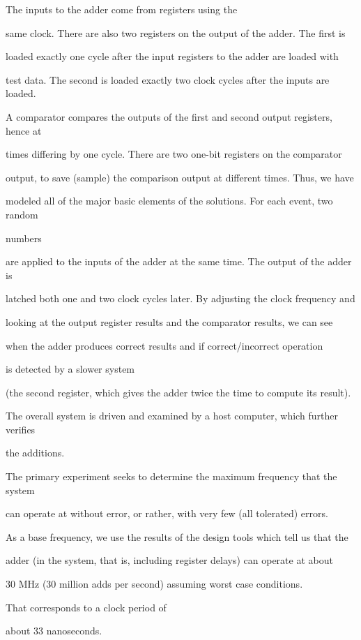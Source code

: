 \documentclass[12pt,dvips]{article}
\begin{document}
The inputs to the adder come from registers using the

same clock. There are also two registers on the output of the adder. The first is

loaded exactly one cycle after the input registers to the adder are loaded with

test data. The second is loaded exactly two clock cycles after the inputs are loaded.

A comparator compares the outputs of the first and second output registers, hence at

times differing by one cycle. There are two one-bit registers on the comparator

output, to save (sample) the comparison output at different times. Thus, we have

modeled all of the major basic elements of the solutions. For each event, two random

numbers 

are applied to the inputs of the adder at the same time. The output of the adder is

latched both one and two clock cycles later. By adjusting the clock frequency and

looking at the output register results and the comparator results, we can see

when the adder produces correct results and if correct/incorrect operation

is detected by a slower system

(the second register, which gives the adder twice the time to compute its result).

The overall system is driven and examined by a host computer, which further verifies

the additions.



The primary experiment seeks to determine the maximum frequency that the system

can operate at without error, or rather, with very few (all tolerated) errors.

As a base frequency, we use the results of the design tools which tell us that the

adder (in the system, that is, including register delays) can operate at about

30 MHz (30 million adds per second) assuming worst case conditions.

That corresponds to a clock period of

about 33 nanoseconds.
\end{document}
